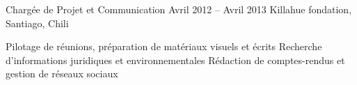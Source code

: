 \begin{joblist}[13.2][7.8][3.4]
{{\begin{itemize}

		\end{itemize}
		}
	}

\item[Chargée de Projet et Communication ]{Avril 2012 -- Avril 2013 }     
  	{
  	Killahue fondation, Santiago, Chili
  	}     
  	{
        \normalsize{
		\iftbftiny \vspace{-0.5cm} \fi
		\begin{itemize}
			  \iftbftiny \setlength\itemsep{-3pt} \fi
			  \cvitem[\checkmark] Pilotage de réunions, préparation de matériaux visuels et écrits                                        
			  \cvitem[\checkmark] Recherche d'informations juridiques et environnementales
			  \cvitem[\checkmark] Rédaction de comptes-rendus et gestion de réseaux sociaux                                         
		\end{itemize}  
		}
	}

   

\end{joblist}


%
%

